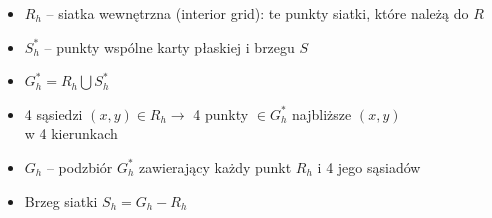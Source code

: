 \begin{frame}
  \begin{block}{}
    \begin{itemize}
      \item $R_h$ -- siatka wewnętrzna (interior grid): te punkty siatki, które należą do $R$
      \item $S_h^*$ -- punkty wspólne karty płaskiej i brzegu $S$
      \item $G_h^* = R_h \bigcup S_h^*$
      \item 4 sąsiedzi $(x,y) \in R_h \rightarrow$ 4 punkty $\in G_h^*$ najbliższe $(x,y)$  \\
w 4 kierunkach
      \item $G_h$ -- podzbiór $G_h^*$ zawierający każdy punkt $R_h$ i 4 jego sąsiadów
      \item Brzeg siatki $S_h = G_h - R_h$
    \end{itemize}
  \end{block}
\end{frame}
